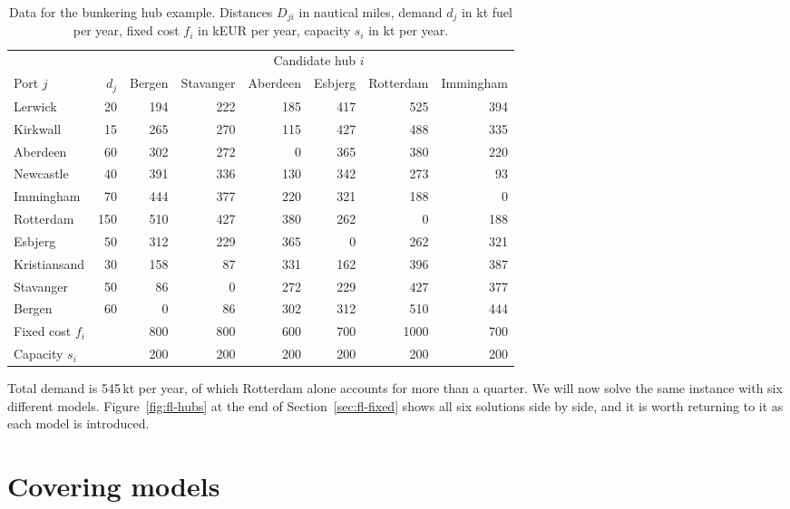 \begin{table}[htbp]
\centering
\caption{Data for the bunkering hub example. Distances $D_{ji}$ in nautical miles, demand $d_j$ in kt fuel per year, fixed cost $f_i$ in kEUR per year, capacity $s_i$ in kt per year.}
\label{tab:fl-data}
\small
\begin{tabular}{@{}lrrrrrrr@{}}
\toprule
 & & \multicolumn{6}{c}{Candidate hub $i$} \\
\cmidrule(l){3-8}
Port $j$ & $d_j$ & Bergen & Stavanger & Aberdeen & Esbjerg & Rotterdam & Immingham \\
\midrule
Lerwick      &  20 & 194 & 222 & 185 & 417 & 525 & 394 \\
Kirkwall     &  15 & 265 & 270 & 115 & 427 & 488 & 335 \\
Aberdeen     &  60 & 302 & 272 &   0 & 365 & 380 & 220 \\
Newcastle    &  40 & 391 & 336 & 130 & 342 & 273 &  93 \\
Immingham    &  70 & 444 & 377 & 220 & 321 & 188 &   0 \\
Rotterdam    & 150 & 510 & 427 & 380 & 262 &   0 & 188 \\
Esbjerg      &  50 & 312 & 229 & 365 &   0 & 262 & 321 \\
Kristiansand &  30 & 158 &  87 & 331 & 162 & 396 & 387 \\
Stavanger    &  50 &  86 &   0 & 272 & 229 & 427 & 377 \\
Bergen       &  60 &   0 &  86 & 302 & 312 & 510 & 444 \\
\midrule
Fixed cost $f_i$ & & 800 & 800 & 600 & 700 & 1000 & 700 \\
Capacity $s_i$   & & 200 & 200 & 200 & 200 &  200 & 200 \\
\bottomrule
\end{tabular}
\end{table}

Total demand is 545\,kt per year, of which Rotterdam alone accounts for more than a quarter. We will now solve the same instance with six different models. Figure~\ref{fig:fl-hubs} at the end of Section~\ref{sec:fl-fixed} shows all six solutions side by side, and it is worth returning to it as each model is introduced.


\section{Covering models}
\label{sec:fl-covering}

